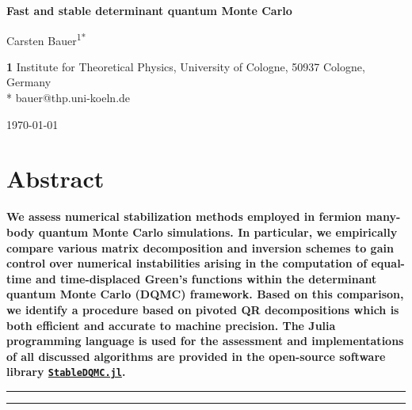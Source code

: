 \documentclass[submission, Phys]{SciPost}
\begin{document}
\begin{center}{\Large \textbf{
Fast and stable determinant quantum Monte Carlo
}}\end{center}

\begin{center}
Carsten Bauer\textsuperscript{1*}
\end{center}

\begin{center}
{\bf 1} Institute for Theoretical Physics, University of Cologne, 50937 Cologne, Germany
\\
* bauer@thp.uni-koeln.de
\end{center}

\begin{center}
\today
\end{center}


\section*{Abstract}
{\bf
We assess numerical stabilization methods employed in fermion many-body quantum Monte Carlo simulations. In particular, we empirically compare various matrix decomposition and inversion schemes to gain control over numerical instabilities arising in the computation of equal-time and time-displaced Green's functions within the determinant quantum Monte Carlo (DQMC) framework. Based on this comparison, we identify a procedure based on pivoted QR decompositions which is both efficient and accurate to machine precision. The Julia programming language is used for the assessment and implementations of all discussed algorithms are provided in the open-source software library \href{http://github.com/crstnbr/StableDQMC.jl}{\texttt{StableDQMC.jl}}.
}


\vspace{10pt}
\noindent\rule{\textwidth}{1pt}
\tableofcontents\thispagestyle{fancy}
\noindent\rule{\textwidth}{1pt}
\vspace{10pt}
\end{document}
